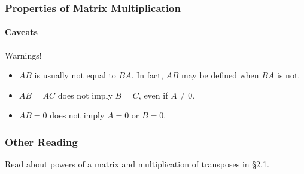 \begin{frame}
\frametitle{Properties of Matrix Multiplication}
\framesubtitle{Caveats}

\alert{\large Warnings!}
\begin{itemize}
\item $AB$ is usually not equal to $BA$.
  \webonlycmd{
  \[\hss \mat{0 -1; 1 0}\mat{2 0; 0 1} = \mat{0 -1; 2 0} \qquad
  \mat{2 0; 0 1}\mat{0 -1; 1 0} = \mat{0 -2; 1 0} \hss\]
  }\pause
  In fact, $AB$ may be defined when $BA$ is not.

\pause\medskip
\item $AB = AC$ does not imply $B = C$, even if $A\neq 0$.
  \webonlycmd{
  \[ \mat{1 0; 0 0}\mat{1 2; 3 4} = \mat{1 2; 0 0}
     = \mat{1 0; 0 0}\mat{1 2; 5 6} \]
   }%

\pause
\item $AB = 0$ does not imply $A=0$ or $B=0$.
  \webonlycmd{
  \[ \mat{1 0; 1 0}\mat{0 0; 1 1} 
  = \mat{0 0; 0 0} \]
}

\end{itemize}

\end{frame}



\begin{frame}
\frametitle{Other Reading}

\vfill

\begin{bluebox}{.8\linewidth}
  Read about powers of a matrix and multiplication of transposes in \S2.1.
\end{bluebox}

\vfill

\end{frame}




